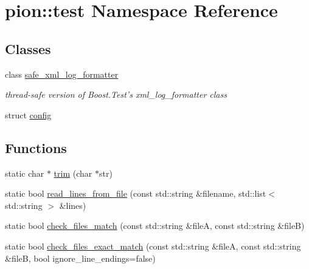 \hypertarget{namespacepion_1_1test}{\section{pion\-:\-:test Namespace Reference}
\label{namespacepion_1_1test}
}
\subsection*{Classes}
\begin{DoxyCompactItemize}
\item 
class \hyperlink{classpion_1_1test_1_1safe__xml__log__formatter}{safe\-\_\-xml\-\_\-log\-\_\-formatter}
\begin{DoxyCompactList}\small\item\em thread-\/safe version of Boost.\-Test's xml\-\_\-log\-\_\-formatter class \end{DoxyCompactList}\item 
struct \hyperlink{structpion_1_1test_1_1config}{config}
\end{DoxyCompactItemize}
\subsection*{Functions}
\begin{DoxyCompactItemize}
\item 
static char $\ast$ \hyperlink{namespacepion_1_1test_a8643b0d0deb0ae53d23bc49cf7d3b5f5}{trim} (char $\ast$str)
\item 
static bool \hyperlink{namespacepion_1_1test_ad544a077fe8df96bda285ca3cb9228f1}{read\-\_\-lines\-\_\-from\-\_\-file} (const std\-::string \&filename, std\-::list$<$ std\-::string $>$ \&lines)
\item 
static bool \hyperlink{namespacepion_1_1test_a555d109b71085d9b0d7a0e0c4d9d3592}{check\-\_\-files\-\_\-match} (const std\-::string \&file\-A, const std\-::string \&file\-B)
\item 
static bool \hyperlink{namespacepion_1_1test_a578e6dab3bf9823953e00948a0915849}{check\-\_\-files\-\_\-exact\-\_\-match} (const std\-::string \&file\-A, const std\-::string \&file\-B, bool ignore\-\_\-line\-\_\-endings=false)
\end{DoxyCompactItemize}


